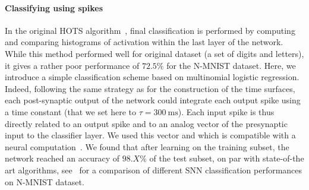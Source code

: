 \documentclass[12pt]{article}
\newcommand{\citep}[1]{\parencite{#1}}
\newcommand{\citet}[1]{\textcite{#1}}
\newcommand{\ms}{\si{\milli\second}}%
\begin{document}
\paragraph*{Classifying using spikes}
In the original HOTS algorithm~\citep{Lagorce17}, final classification is performed by computing and comparing histograms of activation within the last layer of the network. %
While this method performed well for original dataset (a set of digits and letters), it gives a rather poor performance of $72.5\%$ for the N-MNIST dataset.
Here, we introduce a simple classification scheme based on multinomial logistic regression.
Indeed, following the same strategy as for the construction of the time surfaces, each post-synaptic output of the network could integrate each output spike using a time constant (that we set here to $\tau=300~\ms$). Each input spike is thus directly related to an output spike and to an analog vector of the presynaptic input to the classifier layer. We used this vector and which is compatible with a neural computation~\citep{Berens12}. We found that after learning on the training subset, the network reached an accuracy of $98.X\%$ of the test subset, on par with state-of-the art algorithms, see~\citet{He20} for a comparison of different SNN classification performances on N-MNIST dataset.
%
\end{document}
